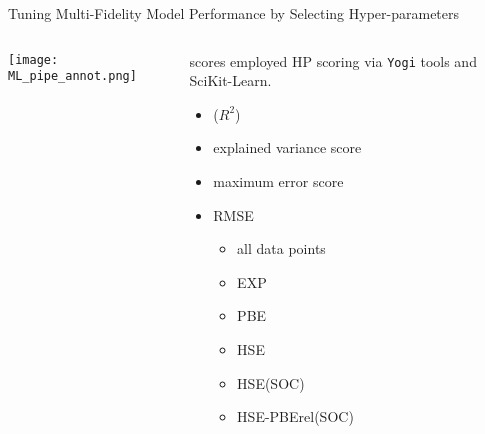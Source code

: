 \documentclass[10pt, aspectratio=169, presentation]{beamer}
\begin{document}
\begin{frame}[label={sec:orgcefb415},fragile]{Tuning Multi-Fidelity Model Performance by Selecting Hyper-parameters}
 \begin{columns}
\begin{column}{0.7\columnwidth}
\begin{center}
\texttt{[image: ML\_pipe\_annot.png]}
\end{center}
\end{column}

\begin{column}{0.3\columnwidth}
\begin{block}{scores employed}
HP scoring via \texttt{Yogi} tools and SciKit-Learn\autocite{manganaris-2022-mrs-comput}.
\begin{itemize}
\item (\(R^2\))
\item explained variance score
\item maximum error score
\item RMSE
\begin{itemize}
\item all data points
\item EXP
\item PBE
\item HSE
\item HSE(SOC)
\item HSE-PBErel(SOC)
\end{itemize}
\end{itemize}
\end{block}
\end{column}
\end{columns}
\end{frame}
\end{document}

